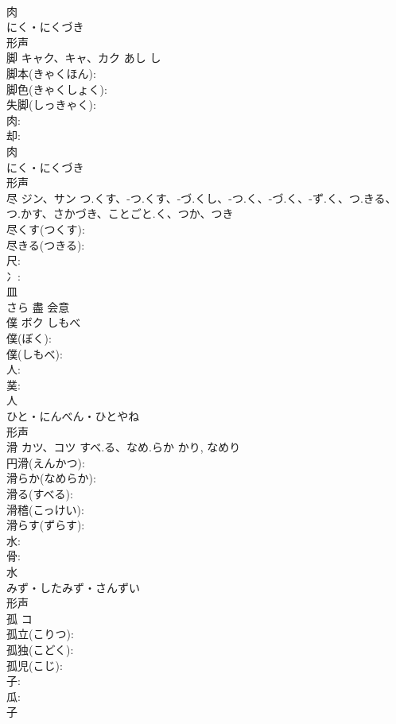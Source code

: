 \documentclass[8pt]{extreport}
\begin{document}
\begin{CJK}{UTF8}{min}
\\	肉	
\\	にく・にくづき	
\\	形声 
\\	脚	キャク、キャ、カク	あし	し	
\\	脚本(きゃくほん): 
\\	脚色(きゃくしょく): 
\\	失脚(しっきゃく): 
\\	肉: 
\\	却: 
\\	肉	
\\	にく・にくづき	
\\	形声 
\\	尽	ジン、サン	つ.くす、-つ.くす、-づ.くし、-つ.く、-づ.く、-ず.く、つ.きる、つ.かす、さかづき、ことごと.く、つか、つき		
\\	尽くす(つくす): 
\\	尽きる(つきる): 
\\	尺: 
\\	冫: 
\\	皿	
\\	さら	盡	会意 
\\	僕	ボク	しもべ		
\\	僕(ぼく): 
\\	僕(しもべ): 
\\	人: 
\\	菐: 
\\	人	
\\	ひと・にんべん・ひとやね	
\\	形声 
\\	滑	カツ、コツ	すべ.る、なめ.らか	かり, なめり	
\\	円滑(えんかつ): 
\\	滑らか(なめらか): 
\\	滑る(すべる): 
\\	滑稽(こっけい): 
\\	滑らす(ずらす): 
\\	水: 
\\	骨: 
\\	水	
\\	みず・したみず・さんずい	
\\	形声 
\\	孤	コ			
\\	孤立(こりつ): 
\\	孤独(こどく): 
\\	孤児(こじ): 
\\	子: 
\\	瓜: 
\\	子	

\end{CJK}
\end{document}
